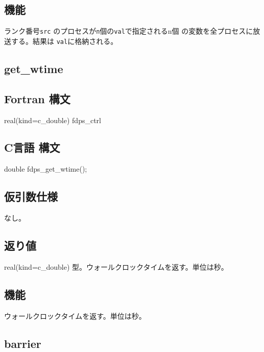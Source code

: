 \subsection*{機能}
ランク番号{\tt src} のプロセスが{\tt n}個の{\tt val}で指定されるn個
の変数を全プロセスに放送する。結果は {\tt val}に格納される。
\clearpage

\subsection{get\_wtime}
\subsection*{Fortran 構文}
\begin{screen}
\begin{spverbatim}
real(kind=c_double) fdps_ctrl%
\end{spverbatim}
\end{screen}

\subsection*{C言語 構文}
\begin{screen}
\begin{spverbatim}
double fdps_get_wtime();
\end{spverbatim}
\end{screen}

\subsection*{仮引数仕様}
なし。

\subsection*{返り値}
real(kind=c\_double) 型。ウォールクロックタイムを返す。単位は秒。

\subsection*{機能}
ウォールクロックタイムを返す。単位は秒。
\clearpage

\subsection{barrier}
